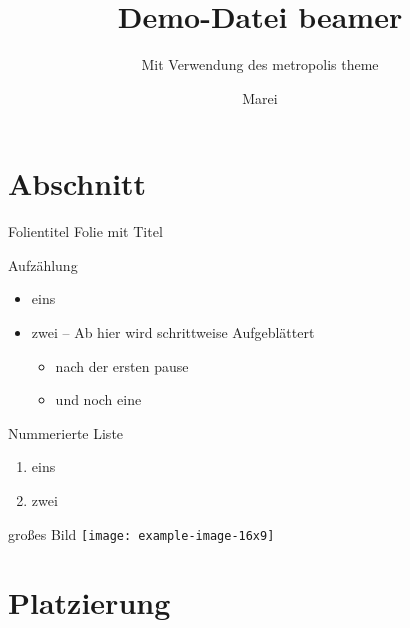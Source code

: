 \documentclass[
	aspectratio=169, %
	]{beamer}
\begin{document}
	
\title{Demo-Datei beamer}
\subtitle{Mit Verwendung des metropolis theme}
\author{Marei}

\frame{\titlepage}

\section{Abschnitt}
\begin{frame}{Folientitel}
Folie mit Titel
\end{frame}

\begin{frame}{Aufzählung}
\begin{itemize}
	\item eins
	\item zwei -- Ab hier wird schrittweise Aufgeblättert
	\pause %
	\begin{itemize}
		\item nach der ersten pause
		\pause
		\item und noch eine	
	\end{itemize}
\end{itemize}
\end{frame}

\begin{frame}{Nummerierte Liste}
\begin{enumerate}
	\item eins
	\item zwei
\end{enumerate}
\end{frame}

\begin{frame}{großes Bild}
\centering%
\texttt{[image: example-image-16x9]}
\end{frame}

\section{Platzierung}
\end{document}
